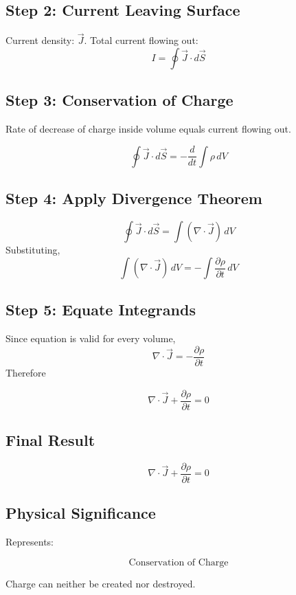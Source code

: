 \documentclass[11pt,a4paper]{article}
\begin{document}
\subsection*{Step 2: Current Leaving Surface}
Current density: \( \vec{J} \).
Total current flowing out:
\[ I = \oint \vec{J} \cdot d\vec{S} \]

\subsection*{Step 3: Conservation of Charge}
Rate of decrease of charge inside volume equals current flowing out.
\begin{tcolorbox}[colback=RoyalBlue!5!white, colframe=RoyalBlue]
    \[ \oint \vec{J} \cdot d\vec{S} = -\frac{d}{dt} \int \rho \, dV \]
\end{tcolorbox}

\subsection*{Step 4: Apply Divergence Theorem}
\[ \oint \vec{J} \cdot d\vec{S} = \int (\nabla \cdot \vec{J}) \, dV \]
Substituting,
\[ \int (\nabla \cdot \vec{J}) \, dV = -\int \frac{\partial\rho}{\partial t} \, dV \]

\subsection*{Step 5: Equate Integrands}
Since equation is valid for every volume,
\[ \nabla \cdot \vec{J} = -\frac{\partial\rho}{\partial t} \]
Therefore
\begin{tcolorbox}[colback=RoyalBlue!5!white, colframe=RoyalBlue]
    \[ \nabla \cdot \vec{J} + \frac{\partial\rho}{\partial t} = 0 \]
\end{tcolorbox}

\subsection*{Final Result}
\begin{tcolorbox}[colback=RoyalBlue!5!white, colframe=RoyalBlue]
    \[ \nabla \cdot \vec{J} + \frac{\partial\rho}{\partial t} = 0 \]
\end{tcolorbox}

\subsection*{Physical Significance}
Represents:
\begin{tcolorbox}[colback=RoyalBlue!5!white, colframe=RoyalBlue]
    \[ \text{Conservation of Charge} \]
\end{tcolorbox}
Charge can neither be created nor destroyed.
\end{document}

